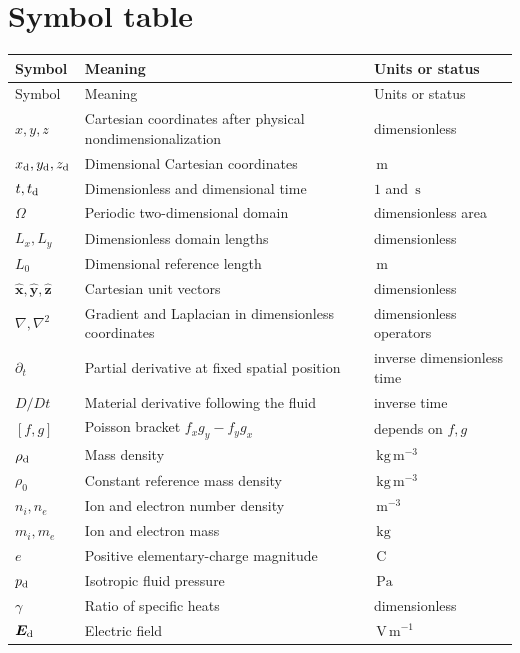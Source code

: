 \documentclass[11pt]{article}
\newcommand{\vect}[1]{\bm{#1}}
\newcommand{\unit}[1]{\,\mathrm{#1}}
\begin{document}
\section{Symbol table}
\label{app:symbols}

\small
\begin{longtable}{p{}p{}p{}}
\toprule
Symbol & Meaning & Units or status \\
\midrule
\endfirsthead
\toprule
Symbol & Meaning & Units or status \\
\midrule
\endhead
$x,y,z$ & Cartesian coordinates after physical nondimensionalization & dimensionless \\
$x_{\rm d},y_{\rm d},z_{\rm d}$ & Dimensional Cartesian coordinates & $\unit{m}$ \\
$t,t_{\rm d}$ & Dimensionless and dimensional time & $1$ and $\unit{s}$ \\
$\Omega$ & Periodic two-dimensional domain & dimensionless area \\
$L_x,L_y$ & Dimensionless domain lengths & dimensionless \\
$L_0$ & Dimensional reference length & $\unit{m}$ \\
$\widehat{\vect{x}},\widehat{\vect{y}},\widehat{\vect{z}}$ & Cartesian unit vectors & dimensionless \\
$\nabla,\nabla^2$ & Gradient and Laplacian in dimensionless coordinates & dimensionless operators \\
$\partial_t$ & Partial derivative at fixed spatial position & inverse dimensionless time \\
$D/Dt$ & Material derivative following the fluid & inverse time \\
$[f,g]$ & Poisson bracket $f_xg_y-f_yg_x$ & depends on $f,g$ \\
$\rho_{\rm d}$ & Mass density & $\unit{kg\,m^{-3}}$ \\
$\rho_0$ & Constant reference mass density & $\unit{kg\,m^{-3}}$ \\
$n_i,n_e$ & Ion and electron number density & $\unit{m^{-3}}$ \\
$m_i,m_e$ & Ion and electron mass & $\unit{kg}$ \\
$e$ & Positive elementary-charge magnitude & $\unit{C}$ \\
$p_{\rm d}$ & Isotropic fluid pressure & $\unit{Pa}$ \\
$\gamma$ & Ratio of specific heats & dimensionless \\
$\vect{E}_{\rm d}$ & Electric field & $\unit{V\,m^{-1}}$ \\

\end{longtable}
\end{document}
